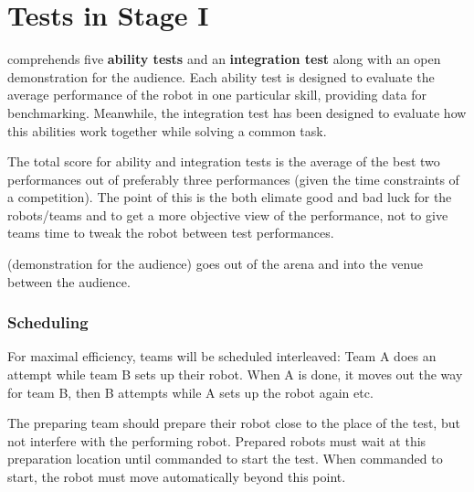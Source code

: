 \documentclass[11pt, twoside, openright, a4paper, chapterprefix]{scrbook}
\begin{document}


\pagestyle{empty}

\clearpage

\pagestyle{empty}
\tableofcontents
\clearpage

\pagestyle{plain}









\chapter{Tests in Stage I}
\label{chap:stage_I}

\begin{itshape}
 comprehends five \textbf{ability tests} and an \textbf{integration test} along with an open demonstration for the audience. 
Each ability test is designed to evaluate the average performance of the robot in one particular skill, providing data for benchmarking. 
Meanwhile, the integration test has been designed to evaluate how this abilities work together while solving a common task.

The total score for ability and integration tests is the average of the best two performances out of preferably three performances (given the time constraints of a competition).
The point of this is the both elimate good and bad luck for the robots/teams and to get a more objective view of the performance, 
  not to give teams time to tweak the robot between test performances. 

 (demonstration for the audience) goes out of the arena and into the venue between the audience. 

\end{itshape}

\subsection*{Scheduling}
For maximal efficiency, teams will be scheduled interleaved: 
  Team A does an attempt while team B sets up their robot. When A is done, it moves out the way for team B, then B attempts while A sets up the robot again etc.

The preparing team should prepare their robot close to the place of the test, but not interfere with the performing robot.
Prepared robots must wait at this preparation location until commanded to start the test.
When commanded to start, the robot must move automatically beyond this point. 
\end{document}
